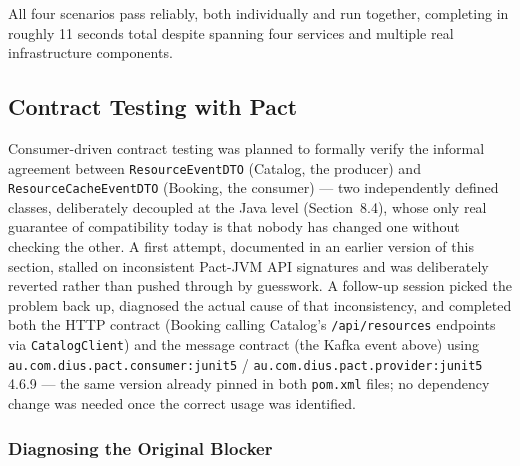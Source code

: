 All four scenarios pass reliably, both individually and run together, completing in roughly 11 seconds total despite spanning four services and multiple real infrastructure components.

\subsection{Contract Testing with Pact}
\label{sec:pact}

Consumer-driven contract testing was planned to formally verify the informal agreement between \texttt{ResourceEventDTO} (Catalog, the producer) and \texttt{ResourceCacheEventDTO} (Booking, the consumer) --- two independently defined classes, deliberately decoupled at the Java level (Section~8.4), whose only real guarantee of compatibility today is that nobody has changed one without checking the other. A first attempt, documented in an earlier version of this section, stalled on inconsistent Pact-JVM API signatures and was deliberately reverted rather than pushed through by guesswork. A follow-up session picked the problem back up, diagnosed the actual cause of that inconsistency, and completed both the HTTP contract (Booking calling Catalog's \texttt{/api/resources} endpoints via \texttt{CatalogClient}) and the message contract (the Kafka event above) using \texttt{au.com.dius.pact.consumer:junit5} / \texttt{au.com.dius.pact.provider:junit5} 4.6.9 --- the same version already pinned in both \texttt{pom.xml} files; no dependency change was needed once the correct usage was identified.

\subsubsection{Diagnosing the Original Blocker}

